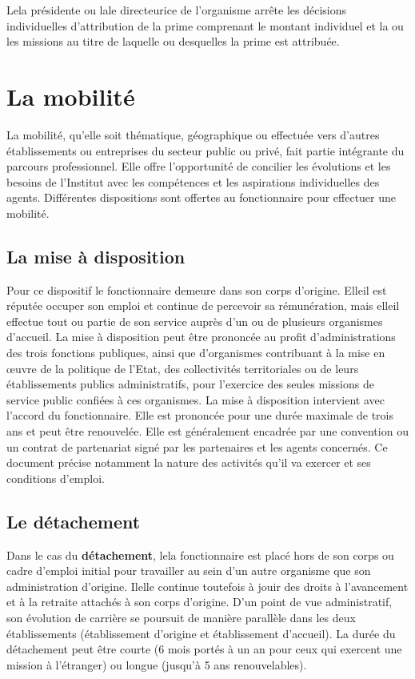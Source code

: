 Le\mp la pr\'esident\mp e ou la\mp le directeur\mp ice de l'organisme arr\^ete les d\'ecisions individuelles d'attribution de la prime comprenant le montant individuel et la ou les missions au titre de laquelle ou desquelles la prime est attribu\'ee.

\section{La mobilit\'e}

La mobilit\'e, qu'elle soit th\'ematique, g\'eographique ou effectu\'ee vers d'autres \'etablissements ou entreprises du secteur public ou priv\'e, fait partie int\'egrante du parcours professionnel. Elle offre l'opportunit\'e de concilier les \'evolutions et les besoins de l'Institut avec les comp\'etences et les aspirations individuelles des agents. Diff\'erentes dispositions sont offertes au fonctionnaire pour effectuer une mobilit\'e. 

\subsection{La mise \`a disposition}

Pour ce dispositif le fonctionnaire demeure dans son corps d'origine. Elle\mp il est r\'eput\'e\mp e occuper son emploi et continue de percevoir sa r\'emun\'eration,
mais elle\mp il effectue tout ou partie de son service aupr\`es d'un ou de plusieurs organismes d'accueil. La mise \`a disposition peut \^etre prononc\'ee au profit d'administrations des trois fonctions publiques, ainsi que d'organismes contribuant \`a la mise en \oe uvre de la politique de l'Etat, des collectivit\'es territoriales ou de leurs \'etablissements publics administratifs, pour l'exercice des seules missions de service public confi\'ees \`a ces organismes. La mise \`a disposition intervient avec l'accord du fonctionnaire. Elle est prononc\'ee pour une dur\'ee maximale de trois ans et peut \^etre renouvel\'ee. Elle est g\'en\'eralement encadr\'ee par une convention ou un contrat  de partenariat sign\'e par les partenaires et les agents concern\'es. Ce document pr\'ecise notamment la nature des activit\'es qu'il va exercer et ses conditions d'emploi.

\subsection{Le d\'etachement}

Dans le cas du {\bf d\'etachement}, le\mp la fonctionnaire est plac\'e hors de son corps ou cadre d'emploi initial pour travailler au sein d'un autre organisme que son administration d'origine. Il\mp elle continue toutefois \`a jouir des droits \`a l'avancement et \`a la retraite attach\'es \`a son corps d'origine. D'un point de vue administratif, son \'evolution de carri\`ere se poursuit de mani\`ere parall\`ele dans les deux \'etablissements (\'etablissement d'origine et \'etablissement d'accueil). La dur\'ee du d\'etachement peut \^etre courte (6 mois port\'es \`a un an pour ceux qui exercent une mission \`a l'\'etranger) ou longue (jusqu'\`a 5 ans renouvelables).

